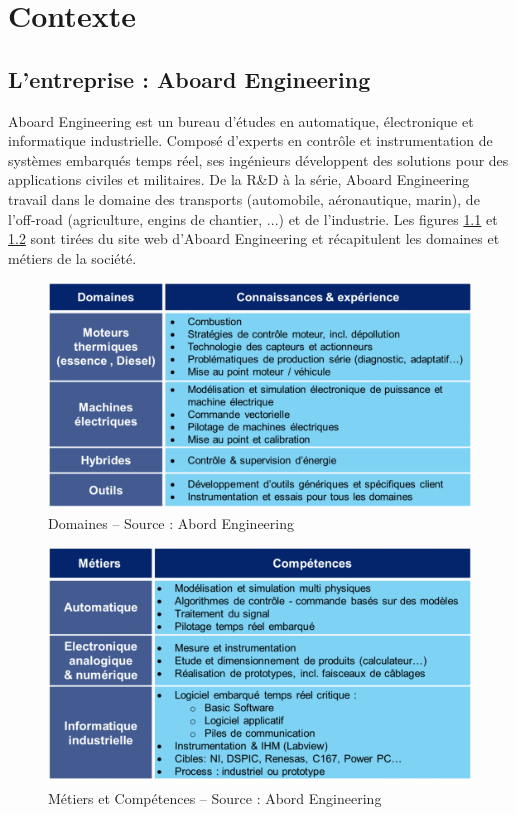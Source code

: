 \chapter{Contexte}
\section{L'entreprise : Aboard Engineering}
Aboard Engineering est un bureau d'études en automatique, électronique et informatique industrielle. Composé d'experts en contrôle et instrumentation de systèmes embarqués temps réel, ses ingénieurs développent des solutions pour des applications civiles et militaires. De la R\&D à la série, Aboard Engineering travail dans le domaine des transports (automobile, aéronautique, marin), de l'off-road (agriculture, engins de chantier, ...) et de l'industrie. Les figures \ref{fig:domaines} et  \ref{fig:metiers} sont tirées du site web d'Aboard Engineering et récapitulent les domaines et métiers de la société.

\begin{figure}[h]
	\center
	\includegraphics[scale=0.4]{images/domaines}
	\caption{Domaines -- Source : Abord Engineering}
	\label{fig:domaines}
\end{figure}

\begin{figure}[h]
	\center
	\includegraphics[scale=0.4]{images/metiers}
	\caption{Métiers et Compétences -- Source : Abord Engineering}
	\label{fig:metiers}
\end{figure}

